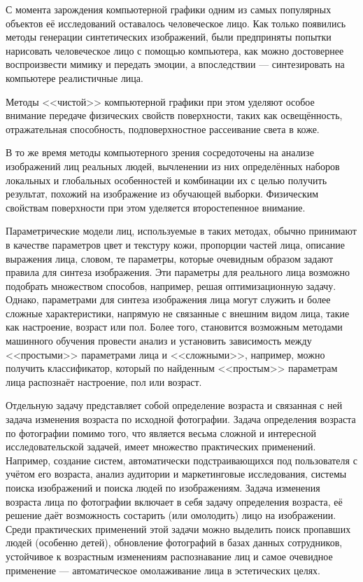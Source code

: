 
\newpage
{}

С момента зарождения компьютерной графики одним из самых популярных объектов её исследований оставалось человеческое лицо. Как только появились методы генерации синтетических изображений, были предприняты попытки нарисовать человеческое лицо с помощью компьютера, как можно достовернее воспроизвести мимику и передать эмоции, а впоследствии --- синтезировать на компьютере реалистичные лица.

Методы <<чистой>> компьютерной графики при этом уделяют особое внимание передаче физических свойств поверхности, таких как освещённость, отражательная способность, подповерхностное рассеивание света в коже.

В то же время методы компьютерного зрения сосредоточены на анализе изображений лиц реальных людей, вычленении из них определённых наборов локальных и глобальных особенностей и комбинации их с целью получить результат, похожий на изображение из обучающей выборки. Физическим свойствам поверхности при этом уделяется второстепенное внимание.

Параметрические модели лиц, используемые в таких методах, обычно принимают в качестве параметров цвет и текстуру кожи, пропорции частей лица, описание выражения лица, словом, те параметры, которые очевидным образом задают правила для синтеза изображения. Эти параметры для реального лица возможно подобрать множеством способов, например, решая оптимизационную задачу. Однако, параметрами для синтеза изображения лица могут служить и более сложные характеристики, напрямую не связанные с внешним видом лица, такие как настроение, возраст или пол. Более того, становится возможным методами машинного обучения провести анализ и установить зависимость между <<простыми>> параметрами лица и <<сложными>>, например, можно получить классификатор, который по найденным <<простым>> параметрам лица распознаёт настроение, пол или возраст.

Отдельную задачу представляет собой определение возраста и связанная с ней задача изменения возраста по исходной фотографии. Задача определения возраста по фотографии помимо того, что является весьма сложной и интересной исследовательской задачей, имеет множество практических применений. Например, создание систем, автоматически подстраивающихся под пользователя с учётом его возраста, анализ аудитории и маркетинговые исследования, системы поиска изображений и поиска людей по изображениям. Задача изменения возраста лица по фотографии включает в себя задачу определения возраста, её решение даёт возможность состарить (или омолодить) лицо на изображении. Среди практических применений этой задачи можно выделить поиск пропавших людей (особенно детей), обновление фотографий в базах данных сотрудников, устойчивое к возрастным изменениям распознавание лиц и самое очевидное применение --- автоматическое омолаживание лица в эстетических целях.

